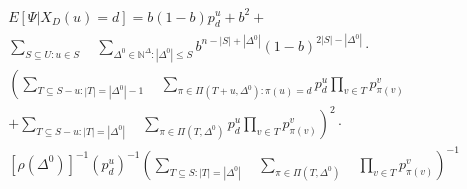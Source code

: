 \documentclass[prodmode,acmtissec]{acmsmall}
\begin{document}
\begin{theorem} \label{yexp}
\begin{multline} \label{ey3}
    E[\Psi | X_D(u)=d] = b(1-b)p^u_d + b^2 +\\
     \sum_{S\subseteq U : u\in S} \quad \sum_{\Delta^0 \in \mathbb{N}^{\Delta}: |\Delta^0|\le S} b^{n-|S|+|\Delta^0|}(1-b)^{2|S|-|\Delta^0|} \cdot \\
     \left( \sum_{T\subseteq S-u: |T|=|\Delta^0|-1} \quad \sum_{\pi \in \Pi(T+u,\Delta^0) : \pi(u)=d} p^u_d \prod_{v\in T} p^v_{\pi(v)} \right. \\
     \left. + \sum_{T\subseteq S-u: |T|=|\Delta^0|} \quad \sum_{\pi \in \Pi(T,\Delta^0)} p^u_d \prod_{v\in T} p^v_{\pi(v)} \right)^2 \cdot \\
     [\rho(\Delta^0)]^{-1}(p^u_d)^{-1} \left(\sum_{T\subseteq S:|T|=|\Delta^0|} \quad \sum_{\pi \in \Pi(T,\Delta^0)} \quad \prod_{v\in T} p^v_{\pi(v)}\right)^{-1}
\end{multline}




\end{theorem}
\end{document}
